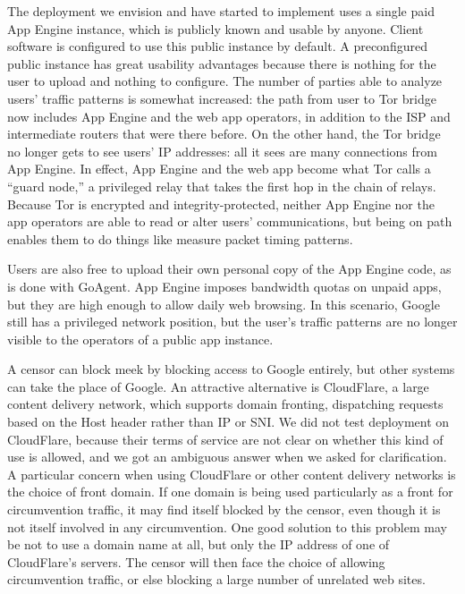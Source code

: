 \documentclass{article}
\begin{document}
The deployment we envision and have started to implement
uses a single paid App Engine instance, which is publicly known and usable by anyone.
Client software is configured to use this public instance by default.
A preconfigured public instance has great usability advantages
because there is nothing for the user to upload and nothing to configure.
The number of parties able to analyze users' traffic patterns is somewhat increased:
the path from user to Tor bridge now includes App Engine and the web app operators,
in addition to the ISP and intermediate routers that were there before.
On the other hand, the Tor bridge no longer gets to see users' IP addresses:
all it sees are many connections from App Engine.
In effect, App Engine and the web app become what Tor calls a ``guard node,''
a privileged relay that takes the first hop in the chain of relays.
Because Tor is encrypted and integrity-protected, neither App Engine nor the app operators
are able to read or alter users' communications, but being on path enables them
to do things like measure packet timing patterns.

Users are also free to upload their own personal copy of the App Engine code, as is done with GoAgent.
App Engine imposes bandwidth quotas on unpaid apps, but they are high enough to allow daily web browsing.
In this scenario, Google still has a privileged network position,
but the user's traffic patterns are no longer visible to the operators of a public app instance.

A censor can block meek by blocking access to Google entirely,
but other systems can take the place of Google.
An attractive alternative is CloudFlare, a large content delivery network,
which supports domain fronting, dispatching requests based on the Host header
rather than IP or SNI.
We did not test deployment on CloudFlare,
because their terms of service are not clear on whether this kind of use is allowed,
and we got an ambiguous answer when we asked for clarification.
A particular concern when using CloudFlare or other content delivery networks is the choice of front domain.
If one domain is being used particularly as a front for circumvention traffic,
it may find itself blocked by the censor, even though it is not itself
involved in any circumvention.
One good solution to this problem may be not to use a domain name at all,
but only the IP address of one of CloudFlare's servers.
The censor will then face the choice of allowing circumvention traffic,
or else blocking a large number of unrelated web sites.
\end{document}
